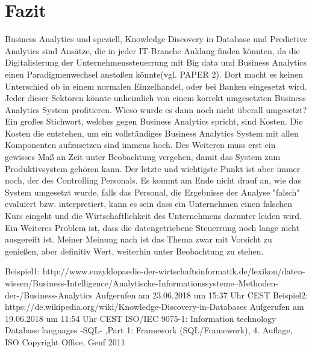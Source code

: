 \documentclass[12pt,twocolumn,twoside]{conference}   %
\begin{document}
\section{Fazit}
Business Analytics und speziell, Knowledge Discovery in Database und Predictive Analytics sind Ansätze, die in jeder IT-Branche Anklang finden könnten, da die Digitalisierung der Unternehmenssteuerrung mit Big data und Business Analytics einen Paradigmenwechsel anstoßen könnte(vgl. PAPER 2). Dort macht es keinen Unterschied ob in einem normalen Einzelhandel, oder bei Banken eingesetzt wird. Jeder dieser Sektoren könnte unheimlich von einem korrekt umgesetzten Business Analytics System profitieren. Wieso wurde es dann noch nicht überall umgesetzt? Ein großes Stichwort, welches gegen Business Analytics spricht, sind Kosten. Die Kosten die entstehen, um ein vollständiges Business Analytics System mit allen Komponenten aufzusetzen sind immens hoch. Des Weiteren muss erst ein gewisses Maß an Zeit unter Beobachtung vergehen, damit das System zum Produktivsystem gehören kann. Der letzte und wichtigste Punkt ist aber immer noch, der des Controlling Personals. Es kommt am Ende nicht drauf an, wie das System umgesetzt wurde, falls das Personal, die Ergebnisse der Analyse "falsch" evaluiert bzw. interpretiert, kann es sein dass ein Unternehmen einen falschen Kurs eingeht und die Wirtschaftlichkeit des Unternehmens darunter leiden wird. Ein Weiteres Problem ist, dass die datengetriebene Steuerrung noch lange nicht ausgereift ist. Meiner Meinung nach ist das Thema zwar mit Vorsicht zu genießen, aber definitiv Wert, weiterhin unter Beobachtung zu stehen. 
\newpage

\begin{thebibliography}{99}
	Beispiel1: http://www.enzyklopaedie-der-wirtschaftsinformatik.de/lexikon/daten-wissen/Business-Intelligence/Analytische-Informationssysteme--Methoden-der-/Business-Analytics 
	Aufgerufen am 23.06.2018 um 15:37 Uhr CEST
	Beispiel2: https://de.wikipedia.org/wiki/Knowledge-Discovery-in-Databases
	Aufgerufen am 19.06.2018 um 11:54 Uhr CEST
	ISO/IEC 9075-1: Information technology
	Database languages -SQL- ,Part 1: Framework
	(SQL/Framework), 4. Auflage, ISO Copyright Office,
	Genf 2011
\end{thebibliography}
\end{document}
